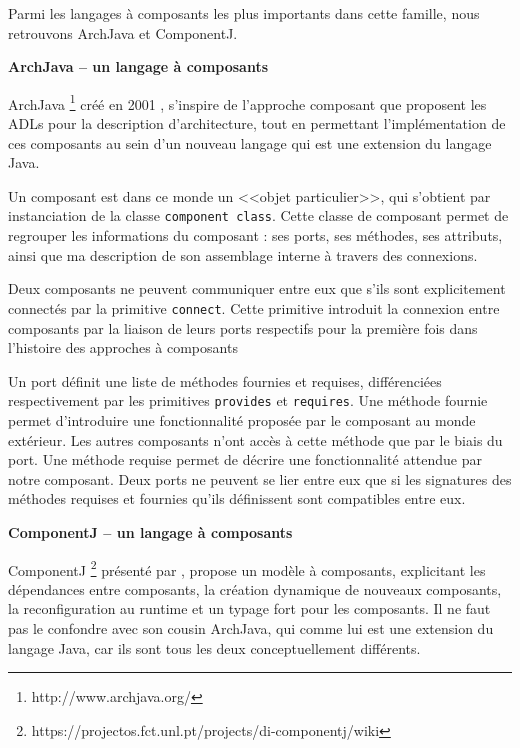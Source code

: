     Parmi les langages à composants les plus importants dans cette famille, nous retrouvons ArchJava et ComponentJ. \\\par
    
      \textbf{ArchJava -- un langage à composants} 
      
      ArchJava \footnote{http://www.archjava.org/} créé en 2001 \cite{DBLP:conf/icse/AldrichCN02}, s'inspire de l'approche composant que proposent les ADLs pour la description d'architecture, tout en permettant l'implémentation de ces composants au sein d'un nouveau langage qui est une extension du langage Java.
      
      Un composant est dans ce monde un <<objet particulier>>, qui s'obtient par instanciation de la classe \texttt{component class}. Cette classe de composant permet de regrouper les informations du composant : ses ports, ses méthodes, ses attributs, ainsi que ma description de son assemblage interne à travers des connexions.
      
  Deux composants ne peuvent communiquer entre eux que s'ils sont explicitement connectés par la primitive \texttt{connect}. Cette primitive introduit la connexion entre composants par la liaison de leurs ports respectifs pour la première fois dans l'histoire des approches à composants 
  
 Un port définit une liste de méthodes fournies et requises, différenciées respectivement par les primitives \texttt{provides} et \texttt{requires}. Une méthode fournie permet d'introduire une fonctionnalité proposée par le composant au monde extérieur. Les autres composants n'ont accès à cette méthode que par le biais du port. Une méthode requise permet de décrire une fonctionnalité attendue par notre composant. Deux ports ne peuvent se lier entre eux que si les signatures des méthodes requises et fournies qu'ils définissent sont compatibles entre eux. \\\par 
  
  \textbf{ComponentJ -- un langage à composants} 

  ComponentJ \footnote{https://projectos.fct.unl.pt/projects/di-componentj/wiki} présenté par \cite{seco2008component}, propose un modèle à composants, explicitant les dépendances entre composants, la création dynamique de nouveaux composants, la reconfiguration au runtime et un typage fort pour les composants. Il ne faut pas le confondre avec son cousin ArchJava, qui comme lui est une extension du langage Java, car ils sont tous les deux conceptuellement différents.

